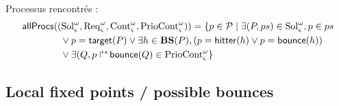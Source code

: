 






Processus rencontrés :
\begin{align*}
&\mathsf{allProcs}((\mathrm{Sol}_\varsigma^\omega,\mathrm{Req}_\varsigma^\omega,\mathrm{Cont}_\varsigma^\omega,\mathrm{PrioCont}_\varsigma^\omega)) = \{ p \in \mathcal{P} \mid \exists (P,ps) \in \mathrm{Sol}_\varsigma^\omega, p \in ps \\
  &\qquad\qquad \vee p = \mathsf{target}(P) \vee \exists h \in \mathbf{BS}(P), (p = \mathsf{hitter}(h) \vee p = \mathsf{bounce}(h)) \\
  &\qquad\qquad \vee \exists(Q, \mbox{$p\Rsh^*\!\mathsf{bounce}(Q)$} \in \mathrm{PrioCont}_\varsigma^\omega \}
\end{align*}

\subsection{Local fixed points / possible bounces}


